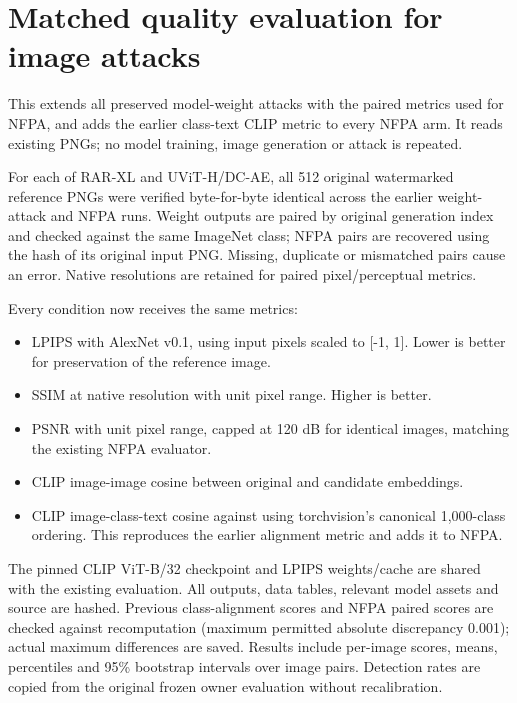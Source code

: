 \section{Matched quality evaluation for image
attacks}\label{record-docs-matched-image-quality-md-matched-quality-evaluation-for-image-attacks}

This extends all preserved model-weight attacks with the paired metrics
used for NFPA, and adds the earlier class-text CLIP metric to every NFPA
arm. It reads existing PNGs; no model training, image generation or
attack is repeated.

For each of RAR-XL and UViT-H/DC-AE, all 512 original watermarked
reference PNGs were verified byte-for-byte identical across the earlier
weight-attack and NFPA runs. Weight outputs are paired by original
generation index and checked against the same ImageNet class; NFPA pairs
are recovered using the hash of its original input PNG. Missing,
duplicate or mismatched pairs cause an error. Native resolutions are
retained for paired pixel/perceptual metrics.

Every condition now receives the same metrics:

\begin{itemize}
\tightlist
\item
  LPIPS with AlexNet v0.1, using input pixels scaled to {[}-1, 1{]}.
  Lower is better for preservation of the reference image.
\item
  SSIM at native resolution with unit pixel range. Higher is better.
\item
  PSNR with unit pixel range, capped at 120 dB for identical images,
  matching the existing NFPA evaluator.
\item
  CLIP image-image cosine between original and candidate embeddings.
\item
  CLIP image-class-text cosine against
  \texttt{} using torchvision's
  canonical 1,000-class ordering. This reproduces the earlier alignment
  metric and adds it to NFPA.
\end{itemize}

The pinned CLIP ViT-B/32 checkpoint and LPIPS weights/cache are shared
with the existing evaluation. All outputs, data tables, relevant model
assets and source are hashed. Previous class-alignment scores and NFPA
paired scores are checked against recomputation (maximum permitted
absolute discrepancy 0.001); actual maximum differences are saved.
Results include per-image scores, means, percentiles and 95\% bootstrap
intervals over image pairs. Detection rates are copied from the original
frozen owner evaluation without recalibration.

